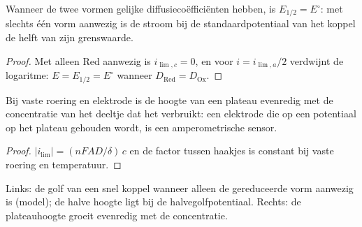\begin{corollary}[Halvegolfpotentiaal]\label{cor:b2:current-potential-curves:half-wave}
Wanneer de twee vormen gelijke diffusiecoëfficiënten hebben, is $E_{1/2} = E^\circ$: met
slechts één vorm aanwezig is de stroom bij de standaardpotentiaal van het koppel
de helft van zijn grenswaarde.
\end{corollary}

\begin{proof}
Met alleen Red aanwezig is $i_{\lim,c} = 0$, en voor $i = i_{\lim,a}/2$ verdwijnt de logaritme:
$E = E_{1/2} = E^\circ$ wanneer $D_{\text{Red}} = D_{\text{Ox}}$.
\end{proof}

\begin{proposition}\label{prop:b2:current-potential-curves:plateau}
Bij vaste roering en elektrode is de hoogte van een plateau evenredig met de
concentratie van het deeltje dat het verbruikt: een elektrode die op een
potentiaal op het plateau gehouden wordt, is een amperometrische sensor.
\end{proposition}

\begin{proof}
$|i_{\lim}| = (nFAD/\delta)\,c$ en de factor tussen haakjes is constant bij vaste
roering en temperatuur.
\end{proof}

\begin{omfigure}
\hfill
{}

{\small Links: de golf van een snel koppel wanneer alleen de gereduceerde vorm aanwezig is
(model); de halve hoogte ligt bij de halvegolfpotentiaal. Rechts: de plateauhoogte
groeit evenredig met de concentratie.}
\end{omfigure}

